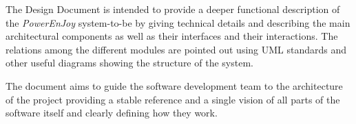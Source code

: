 The Design Document is intended to provide a deeper functional description of the \emph{PowerEnJoy} system-to-be by giving technical details and describing the main architectural components as well as their interfaces and their interactions. The relations among the different modules are pointed out using UML standards and other useful diagrams showing the structure of the system.

The document aims to guide the software development team to the architecture of the project providing a stable reference and a single vision of all parts of the software itself and clearly defining how they work.